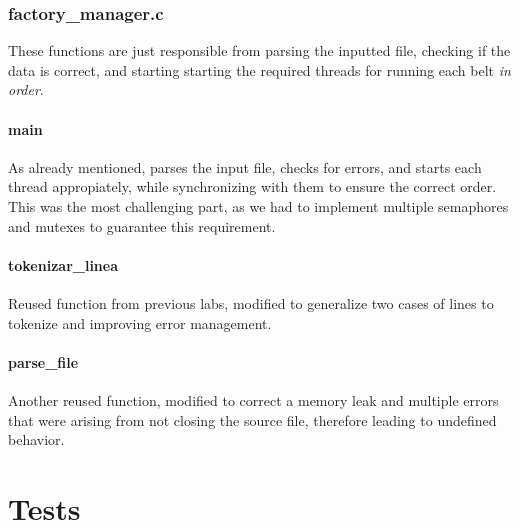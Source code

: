 \documentclass[es]{uc3mreport}
\begin{document}
\begin{report}
      \section{factory\_manager.c}

      \setcounter{subsection}{0}

      \setcounter{subsubsection}{0}

      These functions are just responsible from parsing the inputted
      file, checking if the data is correct, and starting starting the
      required threads for running each belt \emph{in order}.

      \subsection{main}

      \setcounter{subsubsection}{0}

      As already mentioned, parses the input file, checks for errors,
      and starts each thread appropiately, while synchronizing with them
      to ensure the correct order. This was the most challenging part,
      as we had to implement multiple semaphores and mutexes to
      guarantee this requirement.

      \subsection{tokenizar\_linea}

      \setcounter{subsubsection}{0}

      Reused function from previous labs, modified to generalize two
      cases of lines to tokenize and improving error management.

      \subsection{parse\_file}

      \setcounter{subsubsection}{0}

      Another reused function, modified to correct a memory leak and
      multiple errors that were arising from not closing the source
      file, therefore leading to undefined behavior.

      \part{Tests}

      \setcounter{section}{0}


\end{report}
\end{document}
